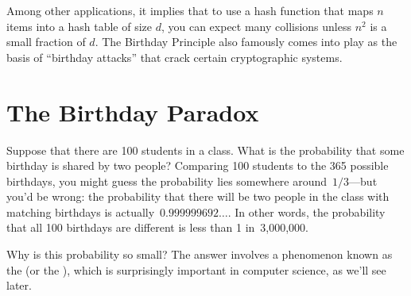 Among other applications, it implies that to use a hash function that
maps $n$ items into a hash table of size $d$, you can expect many
collisions unless $n^2$ is a small fraction of $d$.  The Birthday
Principle also famously comes into play as the basis of ``birthday
attacks'' that crack certain cryptographic systems.
\fi

\begin{problems}

\examproblems
{}

\classproblems
{}

\homeworkproblems
{}

\end{problems}


\iffalse %

\section{The Birthday Paradox}\label{birthday_principle_sec}

Suppose that there are 100 students in a class.  What is the
probability that some birthday is shared by two people?  Comparing 100
students to the 365 possible birthdays, you might guess the
probability lies somewhere around~$1/3$---but you'd be wrong: the
probability that there will be two people in the class with matching
birthdays is actually~$0.999999692\dots$.  In other words, the
probability that all 100 birthdays are different is less than 1
in~3,000,000.

Why is this probability so small?  The answer involves a phenomenon
known as the  (or the ), which is surprisingly important in computer science, as
we'll see later.

